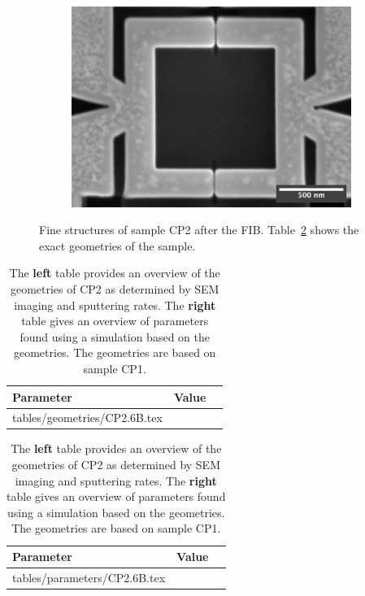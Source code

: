 \begin{figure}[ht!]
\begin{subfigure}[t]{0.3\textwidth}
	\end{subfigure}
	\hfill
	\begin{subfigure}[t]{0.3\textwidth}
		\centering
		\includegraphics[width=\textwidth]{figures/samples/CP2/CP2.6B_SEM_SQUID.jpg}
	\end{subfigure}

	\caption{Fine structures of sample CP2 after the FIB. Table~\ref{tab:CP2.6B-geometries} shows the exact geometries of the sample.}
	\label{fig:CP2.6B-SEM-images}
\end{figure}

\begin{table}
	\begin{subtable}{.6\linewidth}
		\begin{tabular}[t]{@{}lrr@{}}
			\toprule
			Parameter & Value \\ \midrule
			\expandableinput tables/geometries/CP2.6B.tex
			\bottomrule
		\end{tabular}
    \end{subtable}
    \hfill
    \begin{subtable}{.3\linewidth}
    	\flushright
    	\begin{tabular}[t]{@{}lrr@{}}
    		\toprule
    		Parameter & Value \\ \midrule
    		\expandableinput tables/parameters/CP2.6B.tex
    		\bottomrule
    	\end{tabular}
    \end{subtable}
    \caption{The \textbf{left} table provides an overview of the geometries of CP2 as determined by SEM imaging and sputtering rates. The \textbf{right} table gives an overview of parameters found using a simulation based on the geometries. The geometries are based on sample CP1.}
    \label{tab:CP2.6B-geometries}
\end{table}